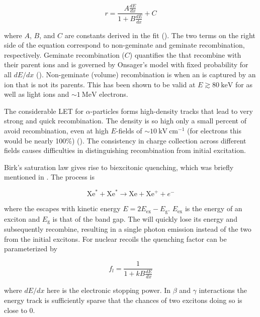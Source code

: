 \begin{equation}
r = \frac{A \frac{dE}{dx}}{1 + B \frac{dE}{dx}} + C
\label{eq:birks_recomb}
\end{equation}

\noindent where $A$, $B$, and $C$ are constants derived in the fit ().  The two terms on the right side of the equation
correspond to
non-geminate and geminate recombination, respectively.  Geminate recombination ($C$) quantifies the
\electron that recombine with their parent ions and is governed by Onsager's model with fixed probability for all $dE/dx$
().  Non-geminate
(volume) recombination is when an \electron is captured by an ion that is not its parents.  This has been shown to be valid at
$E \gtrsim 80\ \mathrm{keV}$ for \gammarays as well as light ions and $\sim 1\ \mathrm{MeV}$ electrons.

The considerable LET for $\alpha$-particles forms high-density tracks that lead to very strong and quick recombination.  The
density is so high only a small percent of \electron avoid recombination, even at high $E$-fields of $\sim 10\ \mathrm{kV\ cm^{-1}}$
(for electrons this would be nearly 100\%) ().  The consistency in charge collection across different fields causes
difficulties in distinguishing recombination from initial excitation.

Birk's saturation law gives rise to biexcitonic quenching, which was briefly mentioned in .  The process is

\begin{equation}
\mathrm{Xe}^{*} + \mathrm{Xe}^{*} \rightarrow \mathrm{Xe} + \mathrm{Xe}^{+} + e^{-}
\label{eq:biexcitonic_again}
\end{equation}

\noindent where the \electron escapes with kinetic energy $E = 2E_{\mathrm{ex}} - E_{\mathrm{g}}$.  $E_{\mathrm{ex}}$ is the energy
of an exciton and $E_{\mathrm{g}}$ is that of the band gap.  The \electron will quickly lose its energy and subsequently recombine,
resulting in a single photon emission instead of the two from the initial excitons.  For nuclear recoils the quenching factor can
be parameterized by

\begin{equation}
f_{l} = \frac{1}{1 + kB \frac{dE}{dx}}
\label{eq:nr_scint_quench}
\end{equation}

\noindent where $dE/dx$ here is the electronic stopping power.  In $\beta$ and $\gamma$ interactions the energy track is
sufficiently sparse that the chances of two excitons doing so is close to 0.

